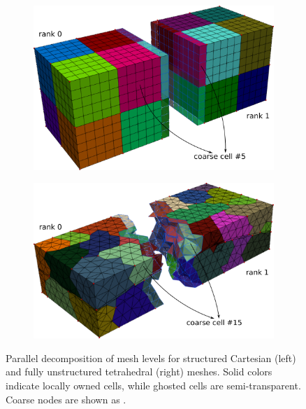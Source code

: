\begin{figure} [htbp]
\begin{subfigure}[t]{0.45\textwidth}
  \centerline{\includegraphics[width=\linewidth]{figs/GEOSX/Cube_parallel_part}}
  \caption{\label{fig:par_decomp_struct}}
\end{subfigure}
\hfill
\begin{subfigure}[t]{0.45\textwidth}
  \centerline{\includegraphics[width=\linewidth]{figs/GEOSX/MazuModel2_parallel_part}}
  \caption{\label{fig:par_decomp_unstruct}}
\end{subfigure}
\caption[Parallel decomposition of multiscale mesh levels]{\label{fig:par_decomp} Parallel decomposition of mesh levels for structured Cartesian (left) and fully unstructured tetrahedral (right) meshes.   Solid colors indicate locally owned cells, while ghosted cells are semi-transparent.   Coarse nodes are shown as .}
\end{figure}

